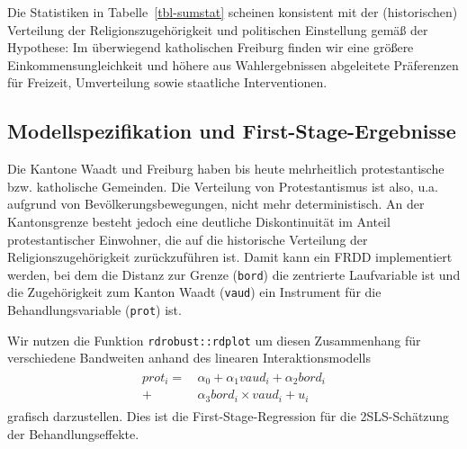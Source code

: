 \documentclass[
  a4paper,
  DIV=11,
  oneside]{scrreprt}
\begin{document}
Die Statistiken in Tabelle~\ref{tbl-sumstat} scheinen konsistent mit der
(historischen) Verteilung der Religionszugehörigkeit und politischen
Einstellung gemäß der Hypothese: Im überwiegend katholischen Freiburg
finden wir eine größere Einkommensungleichkeit und höhere aus
Wahlergebnissen abgeleitete Präferenzen für Freizeit, Umverteilung sowie
staatliche Interventionen.

\subsection{Modellspezifikation und
First-Stage-Ergebnisse}\label{modellspezifikation-und-first-stage-ergebnisse}

Die Kantone Waadt und Freiburg haben bis heute mehrheitlich
protestantische bzw. katholische Gemeinden. Die Verteilung von
Protestantismus ist also, u.a. aufgrund von Bevölkerungsbewegungen,
nicht mehr deterministisch. An der Kantonsgrenze besteht jedoch eine
deutliche Diskontinuität im Anteil protestantischer Einwohner, die auf
die historische Verteilung der Religionszugehörigkeit zurückzuführen
ist. Damit kann ein FRDD implementiert werden, bei dem die Distanz zur
Grenze (\texttt{bord}) die zentrierte Laufvariable ist und die
Zugehörigkeit zum Kanton Waadt (\texttt{vaud}) ein Instrument für die
Behandlungsvariable (\texttt{prot}) ist.

Wir nutzen die Funktion \texttt{rdrobust::rdplot} um diesen Zusammenhang
für verschiedene Bandweiten anhand des linearen Interaktionsmodells
\begin{align}
  \begin{split}
  prot_i =&\, \alpha_0 + \alpha_1 vaud_i + \alpha_2 bord_i \\
  +&\, \alpha_3 bord_i \times vaud_i + u_i
  \end{split}\label{eq:BBFSR}
\end{align} grafisch darzustellen. Dies ist die First-Stage-Regression
für die 2SLS-Schätzung der Behandlungseffekte.
\end{document}

